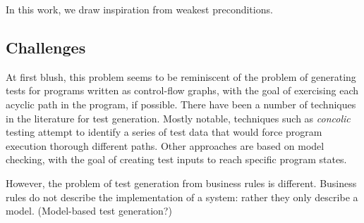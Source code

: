 In this work, we draw inspiration from weakest preconditions.

\subsection{Challenges}

At first blush, this problem seems to be reminiscent of the problem of generating tests for programs 
written as control-flow graphs, with the goal of exercising each acyclic path in the program, if
possible.  There have been a number of techniques in the literature for test generation. Mostly
notable, techniques such as \textit{concolic} testing attempt to identify a series of test data 
that would force program execution thorough different paths.  Other approaches are based on model
checking, with the goal of creating test inputs to reach specific program states.

However, the problem of test generation from business rules is different.  Business rules do not
describe the implementation of a system: rather they only describe a model.  (Model-based test 
generation?)
